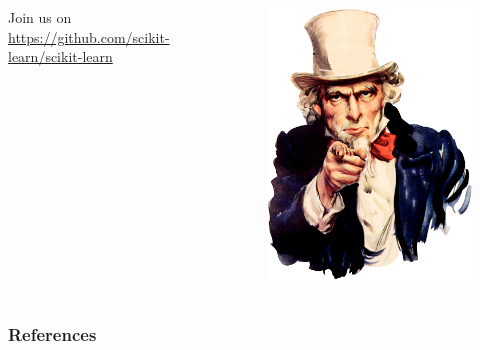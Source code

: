 \documentclass{beamer}
\begin{document}
\begin{frame}
    \begin{columns}
    \begin{column}{0.5\textwidth}

    Join us on \url{https://github.com/scikit-learn/scikit-learn}

    \end{column}
    \begin{column}{0.5\textwidth}
      \begin{figure}
      \includegraphics[width=\textwidth]{./figures/we_want_you.png}
      \end{figure}
    \end{column}
    \end{columns}
\end{frame}

\begin{frame}
    \frametitle{References}
    
    
\end{frame}
\end{document}
